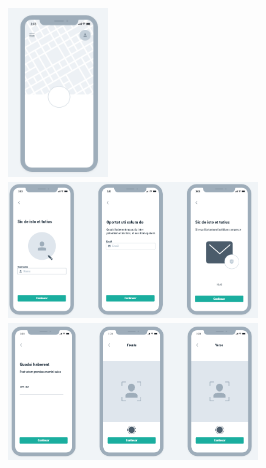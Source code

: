 \begin{center}
\includegraphics[width=100]{exemplos/Wireframe/Wireframe4.PNG}
\\
\includegraphics[width=250]{exemplos/Wireframe/Wireframe5.PNG}
\\
\includegraphics[width=250]{exemplos/Wireframe/Wireframe6.PNG}

\end{center}
